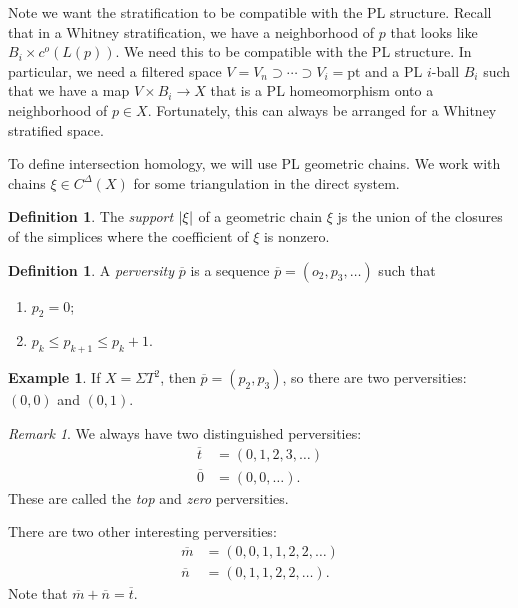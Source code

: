 \documentclass[leqno, openany]{memoir}
\theoremstyle{definition}
\newtheorem{defn}[thm]{Definition}
\newtheorem{exm}[thm]{Example}
\theoremstyle{remark}
\newtheorem{rmk}[thm]{Remark}
\theoremstyle{plain}
\theoremstyle{definition}
\theoremstyle{remark}
\newcommand{\mr}[1]{\mathrm{#1}}
\begin{document}
Note we want the stratification to be compatible with the PL structure. Recall
that in a Whitney stratification, we have a neighborhood of $p$ that looks like
$B_i \times c^o(L(p))$. We need this to be compatible with the PL structure. In
particular, we need a filtered space $V = V_n \supset \cdots \supset V_i =
\mr{pt}$ and a PL $i$-ball $B_i$ such that we have a map $V \times B_i \to X$
that is a PL homeomorphism onto a neighborhood of $p \in X$. Fortunately, this
can always be arranged for a Whitney stratified space.

To define intersection homology, we will use PL geometric chains. We work with
chains $\xi \in C^{\Delta}(X)$ for some triangulation in the direct system.

\begin{defn} The \textit{support} $\abs{\xi}$ of a geometric chain $\xi$ js the
union of the closures of the simplices where the coefficient of $\xi$ is
nonzero.  \end{defn}

\begin{defn} A \textit{perversity} $\overline{p}$ is a sequence $\overline{p} =
(o_2, p_3, \ldots)$ such that \begin{enumerate} \item $p_2 = 0$; \item $p_k
\leq p_{k+1} \leq p_{k} + 1$.  \end{enumerate} \end{defn}

\begin{exm} If $X = \Sigma T^2$, then $\overline{p} = (p_2, p_3)$, so there are
two perversities: $(0,0)$ and $(0,1)$.  \end{exm}

\begin{rmk} We always have two distinguished perversities: \begin{align}
\overline{t} &= (0, 1, 2, 3, \ldots) \\ \overline{0} &= (0, 0, \ldots).
\end{align} These are called the \textit{top} and \textit{zero} perversities.
\end{rmk}

There are two other interesting perversities: \begin{align} \overline{m} &=
(0,0,1,1,2,2,\ldots) \\ \overline{n} &= (0,1,1,2,2,\ldots).  \end{align} Note
that $\overline{m} + \overline{n} = \overline{t}$.
\end{document}

